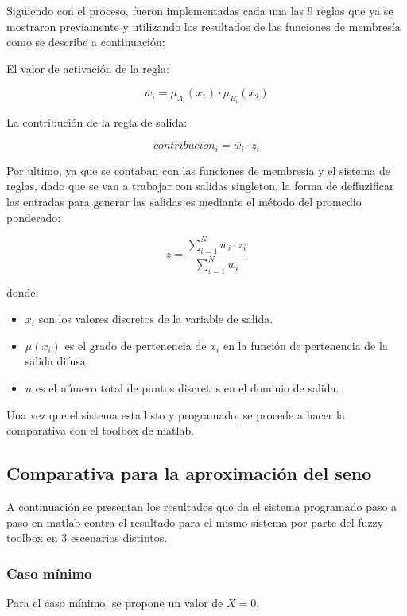 \documentclass[11pt, letterpaper]{article}
\begin{document}
Siguiendo con el proceso, fueron implementadas cada una las 9 reglas que ya se mostraron previamente y utilizando los resultados de las funciones de membresía como se describe a continuación:

El valor de activación de la regla:

$$
w_i = \mu_{A_i}(x_1) \cdot \mu_{B_i}(x_2)
$$

La contribución de la regla de salida:

$$
contribucion_i = w_i \cdot z_i
$$

Por ultimo, ya que se contaban con las funciones de membresía y el sistema de reglas, dado que se van a trabajar con salidas singleton, la forma de deffuzificar las entradas para generar las salidas es mediante el método del promedio ponderado:


$$
z = \frac{\sum_{i=1}^{N} w_i \cdot z_i}{\sum_{i=1}^{N} w_i}
$$




donde:

\begin{itemize}
	\item \( x_i \) son los valores discretos de la variable de salida.
	\item \( \mu(x_i) \) es el grado de pertenencia de \( x_i \) en la función de pertenencia de la salida difusa.
	\item \( n \) es el número total de puntos discretos en el dominio de salida.
\end{itemize}

Una vez que el sistema esta listo y programado, se procede a hacer la comparativa con el toolbox de matlab.

\newpage

\subsection{Comparativa para la aproximación del seno}

A continuación se presentan los resultados que da el sistema programado paso a paso en matlab contra el resultado para el mismo sistema por parte del fuzzy toolbox en 3 escenarios distintos.

\subsubsection{Caso mínimo}

Para el caso mínimo, se propone un valor de $X = 0$.
\end{document}
